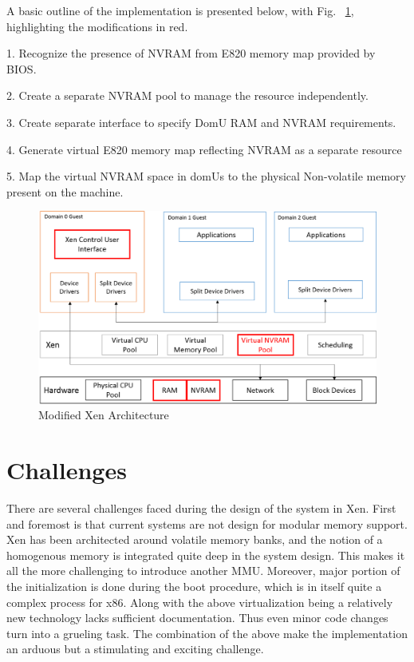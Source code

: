 A basic outline of the implementation is presented below, with Fig. ~\ref{fig:xen_mod}, highlighting the modifications in red. 

1. Recognize the presence of NVRAM from E820 memory map provided by BIOS. 

2. Create a separate NVRAM pool to manage the resource independently. 

3. Create separate interface to specify DomU RAM and NVRAM requirements. 

4. Generate virtual E820 memory map reflecting NVRAM as a separate resource 

5. Map the virtual NVRAM space in domUs to the physical Non-volatile memory present on the machine. 

\begin{figure}
\centering
\includegraphics[scale=0.6]{figures/Xen_mod_model.png}
\caption{Modified Xen Architecture}
\label{fig:xen_mod}
\end{figure}

\section{Challenges}

There are several challenges faced during the design of the system in Xen. First and foremost is that current systems are not design for modular memory support. Xen has been architected around volatile memory banks, and the notion of a homogenous memory is integrated quite deep in the system design. This makes it all the more challenging to introduce another MMU. Moreover, major portion of the initialization is done during the boot procedure, which is in itself quite a complex process for x86. Along with the above virtualization being a relatively new technology lacks sufficient documentation. Thus even minor code changes turn into a grueling task. The combination of the above make the implementation an arduous but a stimulating and exciting challenge. 


